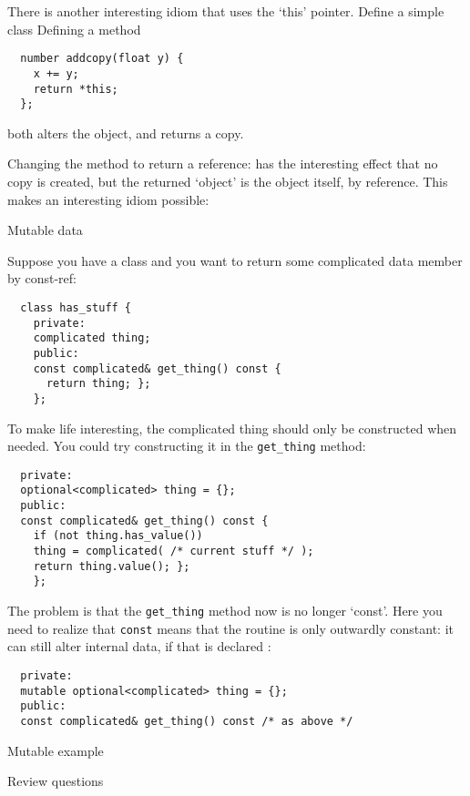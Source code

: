 There is another interesting idiom that uses the `this' pointer.
Define a simple class
%
%
Defining a method
\begin{lstlisting}
  number addcopy(float y) {
    x += y;
    return *this;
  };
\end{lstlisting}
both alters the object, and returns a copy.

Changing the method to return a reference:
%
%
has the interesting effect that no copy is created,
but the returned `object' is the object itself,
by reference.
This makes an interesting idiom possible:
%

 {Mutable data}

Suppose you have a class and you want to return
some complicated data member by const-ref:
\begin{lstlisting}
  class has_stuff {
    private:
    complicated thing;
    public:
    const complicated& get_thing() const {
      return thing; };
    };
\end{lstlisting}
To make life interesting, the complicated thing
should only be constructed when needed.
You could try constructing it in the \lstinline{get_thing} method:
\begin{lstlisting}
  private:
  optional<complicated> thing = {};
  public:
  const complicated& get_thing() const {
    if (not thing.has_value())
    thing = complicated( /* current stuff */ );
    return thing.value(); };
    };  
\end{lstlisting}
The problem is that the \lstinline{get_thing} method now
is no longer `const'.
Here you need to realize that \lstinline{const} means that the routine
is only outwardly constant: it can still alter internal data,
if that is declared :
\begin{lstlisting}
  private:
  mutable optional<complicated> thing = {};
  public:
  const complicated& get_thing() const /* as above */
\end{lstlisting}

\begin{block}{Mutable example}
  \label{sl:with-mutable}
\end{block}

 {Review questions}

